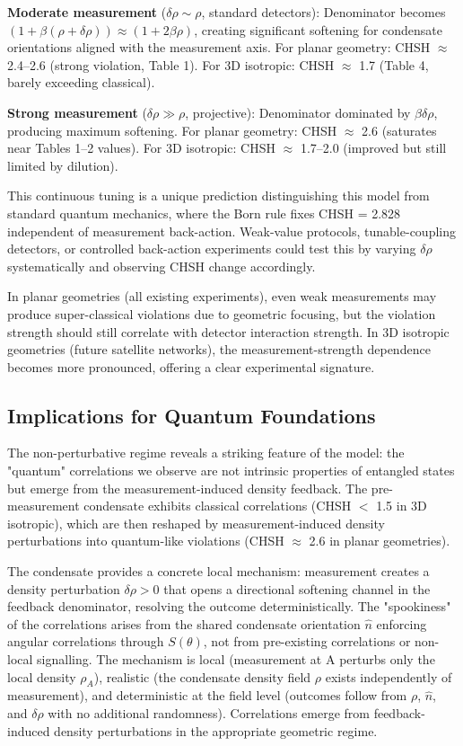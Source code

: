 \documentclass[11pt,a4paper]{article}
\theoremstyle{definition}
\theoremstyle{remark}
\begin{document}
\textbf{Moderate measurement} ($\delta\rho \sim \rho$, standard detectors): Denominator becomes $(1 + \beta(\rho + \delta\rho)) \approx (1 + 2\beta\rho)$, creating significant softening for condensate orientations aligned with the measurement axis. For planar geometry: CHSH $\approx$ 2.4--2.6 (strong violation, Table 1). For 3D isotropic: CHSH $\approx$ 1.7 (Table 4, barely exceeding classical).

\textbf{Strong measurement} ($\delta\rho \gg \rho$, projective): Denominator dominated by $\beta\delta\rho$, producing maximum softening. For planar geometry: CHSH $\approx$ 2.6 (saturates near Tables 1--2 values). For 3D isotropic: CHSH $\approx$ 1.7--2.0 (improved but still limited by dilution).

This continuous tuning is a unique prediction distinguishing this model from standard quantum mechanics, where the Born rule fixes CHSH = 2.828 independent of measurement back-action. Weak-value protocols, tunable-coupling detectors, or controlled back-action experiments could test this by varying $\delta\rho$ systematically and observing CHSH change accordingly.

In planar geometries (all existing experiments), even weak measurements may produce super-classical violations due to geometric focusing, but the violation strength should still correlate with detector interaction strength. In 3D isotropic geometries (future satellite networks), the measurement-strength dependence becomes more pronounced, offering a clear experimental signature.

\subsection{Implications for Quantum Foundations}

The non-perturbative regime reveals a striking feature of the model: the "quantum" correlations we observe are not intrinsic properties of entangled states but emerge from the measurement-induced density feedback. The pre-measurement condensate exhibits classical correlations (CHSH $<$ 1.5 in 3D isotropic), which are then reshaped by measurement-induced density perturbations into quantum-like violations (CHSH $\approx$ 2.6 in planar geometries).

The condensate provides a concrete local mechanism: measurement creates a density perturbation $\delta\rho > 0$ that opens a directional softening channel in the feedback denominator, resolving the outcome deterministically. The "spookiness" of the correlations arises from the shared condensate orientation $\hat{n}$ enforcing angular correlations through $S(\theta)$, not from pre-existing correlations or non-local signalling. The mechanism is local (measurement at A perturbs only the local density $\rho_A$), realistic (the condensate density field $\rho$ exists independently of measurement), and deterministic at the field level (outcomes follow from $\rho$, $\hat{n}$, and $\delta\rho$ with no additional randomness). Correlations emerge from feedback-induced density perturbations in the appropriate geometric regime.
\end{document}
